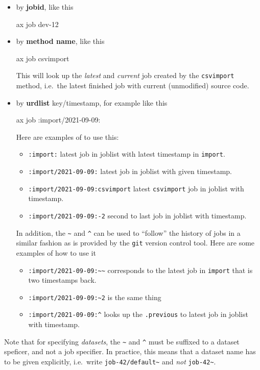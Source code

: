 \begin{itemize}
\item[] by \textbf{jobid}, like this
  \begin{shell}
    ax job dev-12
  \end{shell}
\item[] by \textbf{method name}, like this
  \begin{shell}
    ax job csvimport
  \end{shell}
  This will look up the \textsl{latest} and \textsl{current} job
  created by the \texttt{csvimport} method, i.e.\ the latest finished
  job with current (unmodified) source code.
\item[] by \textbf{urdlist} key/timestamp, for example like this
  \begin{shell}
    ax job :import/2021-09-09:
  \end{shell}
  Here are examples of to use this:
  \begin{itemize}
    \item[] \texttt{:import:} latest job in joblist with latest timestamp in \texttt{import}.
    \item[] \texttt{:import/2021-09-09:} latest job in joblist with given timestamp.
    \item[] \texttt{:import/2021-09-09:csvimport} latest \texttt{csvimport} job in joblist with timestamp.
    \item[] \texttt{:import/2021-09-09:-2} second to last job in joblist with timestamp.
  \end{itemize}

  In addition, the \texttt{\textasciitilde} and \texttt{\texttt{\^{}}}
  can be used to ``follow'' the history of jobs in a similar fashion
  as is provided by the \texttt{git} version control tool.  Here are
  some examples of how to use it
  \begin{itemize}
  \item[] \texttt{:import/2021-09-09:\textasciitilde\textasciitilde} corresponds to the
    latest job in \texttt{import} that is two timestamps back.
  \item[] \texttt{:import/2021-09-09:\textasciitilde 2} is the same thing
  \item[] \texttt{:import/2021-09-09:\^{}} looks up the
    \texttt{.previous} to latest job in joblist with timestamp.
  \end{itemize}
\end{itemize}

Note that for specifying \textsl{datasets}, the
\texttt{\textasciitilde} and \texttt{\^{}} must be suffixed to a
dataset speficer, and not a job specifier.  In practice, this means
that a dataset name has to be given explicitly, i.e.\ write
\texttt{job-42/default\textasciitilde} and \textsl{not} \texttt{job-42\textasciitilde}.



